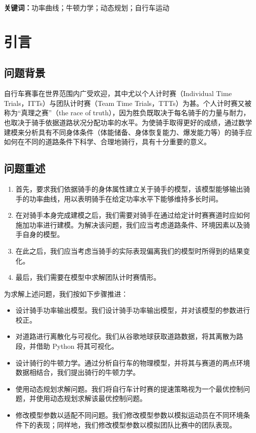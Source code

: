 \documentclass[11pt,a4paper]{ctexart}
\begin{document}
\vspace{6pt}
\noindent\textbf{关键词：}功率曲线；牛顿力学；动态规划；自行车运动

\newpage
\pagestyle{fancy}

\section{引言}

\subsection{问题背景}

自行车赛事在世界范围内广受欢迎，其中尤以个人计时赛（Individual Time Trials，ITTs）与团队计时赛（Team Time Trials，TTTs）为甚。个人计时赛又被称为“真理之赛”（the race of truth），因为胜负既取决于每名骑手的力量与耐力，也取决于骑手依据道路状况分配功率的水平。为使骑手取得更好的成绩，通过数学建模来分析具有不同身体条件（体能储备、身体恢复能力、爆发能力等）的骑手应如何在不同的道路条件下科学、合理地骑行，具有十分重要的意义。

\subsection{问题重述}

\begin{enumerate}
\item 首先，要求我们依据骑手的身体属性建立关于骑手的模型，该模型能够输出骑手的功率曲线，用以表明骑手在给定功率水平下能够维持多长时间。
\item 在对骑手本身完成建模之后，我们需要对骑手在通过给定计时赛赛道时应如何施加功率进行建模。为解决该问题，我们应当考虑道路条件、环境因素以及骑手自身的模型。
\item 在此之后，我们应当考虑当骑手的实际表现偏离我们的模型时所得到的结果变化。
\item 最后，我们需要在模型中求解团队计时赛情形。
\end{enumerate}

为求解上述问题，我们按如下步骤推进：

\begin{itemize}
\item 设计骑手功率输出模型。我们设计骑手功率输出模型，并对该模型的参数进行校正。
\item 对道路进行离散化与可视化。我们从谷歌地球获取道路数据，将其离散为路段，并借助 Python 将其可视化。
\item 设计骑行的牛顿力学。通过分析自行车的物理模型，并将其与赛道的两点环境数据相结合，我们提出骑行的牛顿力学。
\item 使用动态规划求解问题。我们将自行车计时赛的提速策略视为一个最优控制问题，并使用动态规划求解该最优控制问题。
\item 修改模型参数以适配不同问题。我们修改模型参数以模拟运动员在不同环境条件下的表现；同样地，我们修改模型参数以模拟团队比赛中的团队表现。
\end{itemize}
\end{document}
